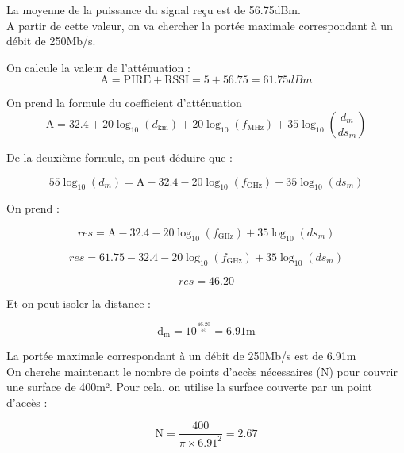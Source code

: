 \documentclass[12]{article}
\begin{document}
La moyenne de la puissance du signal reçu est de 56.75dBm. \\

A partir de cette valeur, on va chercher la portée maximale correspondant à un débit de 250Mb/s.

On calcule la valeur de l'atténuation :
\begin{equation*}
    \text{A}= \text{PIRE}+\text{RSSI}= 5 + 56.75 = 61.75dBm
\end{equation*}

On prend la formule du coefficient d'atténuation
\begin{equation*}
    \text{A} = 32.4 + 20 \log_{10}(d_\text{km}) + 20 \log_{10}(f_\text{MHz}) + 35 \log_{10} \left( \frac{d_m}{ds_m} \right)
\end{equation*}

De la deuxième formule, on peut déduire que :

\begin{equation*}
    55 \log_{10} \left( d_m \right) = \text{A} - 32.4 - 20 \log_{10}(f_\text{GHz}) + 35 \log_{10} \left( ds_m \right)
\end{equation*}

On prend : 

\begin{equation*}
    res = \text{A} - 32.4 - 20 \log_{10}(f_\text{GHz}) + 35 \log_{10} \left( ds_m \right)
\end{equation*}

\begin{equation*}
    res = 61.75 - 32.4 - 20 \log_{10}(f_\text{GHz}) + 35 \log_{10} \left( ds_m \right)
\end{equation*}

\begin{equation*}
    res = 46.20
\end{equation*}

Et on peut isoler la distance : 

\begin{equation*}
    \text{d}_\text{m} = 10^{\frac{46.20}{55}} = 6.91 \text{m}
\end{equation*}

La portée maximale correspondant à un débit de 250Mb/s est de 6.91m \\

On cherche maintenant le nombre de points d'accès nécessaires (N) pour couvrir une surface de 400m². Pour cela, on utilise la surface couverte par un point d'accès : 

\begin{equation*}
    \text{N} = \frac{400}{\pi \times 6.91^2} = 2.67
\end{equation*}
\end{document}
